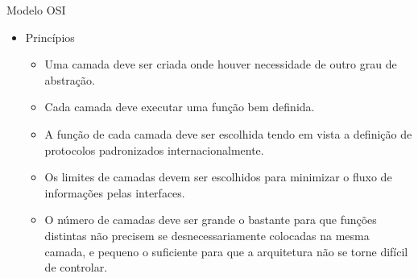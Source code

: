 \documentclass{libs/ufc_format}
\begin{document}
\begin{frame}{Modelo OSI}
    \begin{itemize}
        \item Princípios
            \begin{itemize}
                \justifying
                \item<2-3> Uma camada deve ser criada onde houver necessidade de outro grau de abstração.
                \item<3-4> Cada camada deve executar uma função bem definida.
                \item<4-5> A função de cada camada deve ser escolhida tendo em vista a definição de protocolos padronizados internacionalmente.
                \item<5-> Os limites de camadas devem ser escolhidos para minimizar o fluxo de informações pelas interfaces.
                \item<6-> O número de camadas deve ser grande o bastante para que funções distintas não precisem se desnecessariamente colocadas na mesma camada, e pequeno o suficiente para que a arquitetura não se torne difícil de controlar.
            \end{itemize}
    \end{itemize}
\end{frame}
\end{document}
